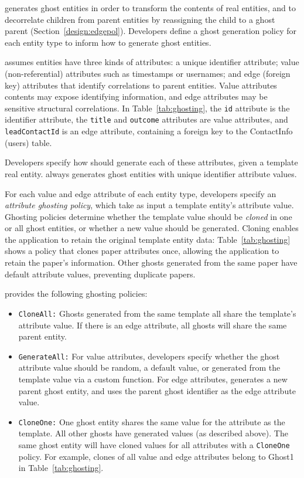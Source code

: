 \proto generates ghost entities in order to transform the contents of real entities, and to
decorrelate children from parent entities by reassigning the child to a ghost parent
(Section~\ref{design:edgepol}). Developers define a ghost generation policy for each entity type to
inform \proto how to generate ghost entities.

\proto assumes entities have three kinds of attributes: a unique identifier attribute; value
(non-referential) attributes such as timestamps or usernames; and edge (foreign key)
attributes that identify correlations to parent entities.  Value attributes contents may expose
identifying information, and edge attributes may be sensitive structural correlations.
In Table~\ref{tab:ghosting}, the \texttt{id} attribute is the identifier attribute, the
\texttt{title} and \texttt{outcome} attributes are value attributes, and \texttt{leadContactId} is
an edge attribute, containing a foreign key to the ContactInfo (users) table. 

Developers specify how \proto should generate each of these attributes, given a template real
entity.
\proto always generates ghost entities with unique identifier attribute values.

For each value and edge attribute of each entity type, developers specify an \emph{attribute ghosting policy},
which take as input a template entity's attribute value. Ghosting policies determine whether the
template value should be \emph{cloned} in one or all ghost entities, or whether
a new value should be generated. Cloning enables the application to retain
the original template entity data: Table~\ref{tab:ghosting} shows a policy that clones
paper attributes once, allowing the application to retain the paper's information. Other ghosts
generated from the same paper have default attribute values, preventing duplicate papers.

\proto provides the following ghosting policies:
\begin{itemize}
    \item \texttt{CloneAll:} Ghosts generated from the same template all share the template's 
        attribute value. If there is an edge attribute, all ghosts will share the
        same parent entity.

    \item \texttt{GenerateAll:} 
        For value attributes, developers specify whether the ghost attribute value should be
        random, a default value, or generated from the template value via a custom function.
        For edge attributes, \proto generates a new parent ghost entity, and uses the parent ghost
        identifier as the edge attribute value.

    \item \texttt{CloneOne:} One ghost entity shares the same value for the attribute as the
        template. All other ghosts have generated values (as described above).
        The same ghost entity will have cloned values for all attributes with a
        \texttt{CloneOne} policy. For example, clones of all value and edge attributes belong to
        Ghost1 in Table~\ref{tab:ghosting}.
\end{itemize}

